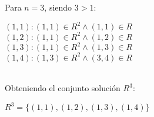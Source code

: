 \documentclass{article}
\begin{document}
\begin{center}
 Para $n = 3$, siendo $3 > 1$:

$(1,1) : (1,1) \in R^2 \wedge (1,1) \in R$
\\$(1,2) : (1,1) \in R^2 \wedge (1,2) \in R$
\\$(1,3) : (1,1) \in R^2 \wedge (1,3) \in R$
\\$(1,4) : (1,3) \in R^2 \wedge (3,4) \in R$
\end{center}
\\
Obteniendo el conjunto solución $R^3$:


\begin{center}
$R^3 = \lbrace{(1, 1),(1, 2),(1, 3),(1, 4)}\rbrace$
\end{center}
\end{document}
